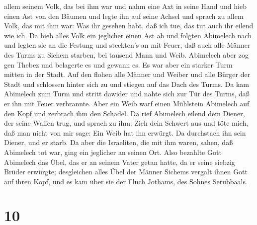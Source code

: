 allem seinem Volk, das bei ihm war und nahm eine Axt in seine Hand und
hieb einen Ast von den Bäumen und legte ihn auf seine Achsel und sprach
zu allem Volk, das mit ihm war: Was ihr gesehen habt, daß ich tue, das
tut auch ihr eilend wie ich.  Da hieb alles Volk ein
jeglicher einen Ast ab und folgten Abimelech nach und legten sie an die
Festung und steckten's an mit Feuer, daß auch alle Männer des Turms zu
Sichem starben, bei tausend Mann und Weib.  Abimelech aber
zog gen Thebez und belagerte es und gewann es.  Es war aber
ein starker Turm mitten in der Stadt. Auf den flohen alle Männer und
Weiber und alle Bürger der Stadt und schlossen hinter sich zu und
stiegen auf das Dach des Turms.  Da kam Abimelech zum Turm
und stritt dawider und nahte sich zur Tür des Turms, daß er ihn mit
Feuer verbrannte.  Aber ein Weib warf einen Mühlstein
Abimelech auf den Kopf und zerbrach ihm den Schädel.  Da
rief Abimelech eilend dem Diener, der seine Waffen trug, und sprach zu
ihm: Zieh dein Schwert aus und töte mich, daß man nicht von mir sage:
Ein Weib hat ihn erwürgt. Da durchstach ihn sein Diener, und er starb.
 Da aber die Israeliten, die mit ihm waren, sahen, daß
Abimelech tot war, ging ein jeglicher an seinen Ort.  Also
bezahlte Gott Abimelech das Übel, das er an seinem Vater getan hatte, da
er seine siebzig Brüder erwürgte;  desgleichen alles Übel
der Männer Sichems vergalt ihnen Gott auf ihren Kopf, und es kam über
sie der Fluch Jothams, des Sohnes Serubbaals.

\hypertarget{section-9}{%
\section{10}\label{section-9}}


